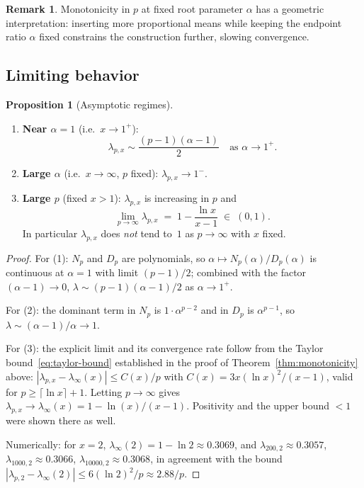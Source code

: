 \documentclass[11pt,a4paper]{article}
\theoremstyle{definition}
\newtheorem{proposition}{Proposition}[section]
\newtheorem{remark}{Remark}[section]
\begin{document}
\begin{remark}
Monotonicity in $p$ at fixed root parameter $\alpha$ has a geometric interpretation: inserting more proportional means while keeping the endpoint ratio $\alpha$ fixed constrains the construction further, slowing convergence.
\end{remark}

\subsection{Limiting behavior}

\begin{proposition}[Asymptotic regimes]
\label{prop:limits}
\mbox{}
\begin{enumerate}
  \item \textbf{Near $\alpha = 1$} (i.e.\ $x \to 1^+$):
  \[
    \lambda_{p,x} \sim \frac{(p-1)(\alpha - 1)}{2} \quad \text{as } \alpha \to 1^+.
  \]
  \item \textbf{Large $\alpha$} (i.e.\ $x \to \infty$, $p$ fixed): $\lambda_{p,x} \to 1^-$.
  \item \textbf{Large $p$} (fixed $x > 1$): $\lambda_{p,x}$ is increasing in $p$ and
  \[
    \lim_{p \to \infty} \lambda_{p,x} \;=\; 1 - \frac{\ln x}{x - 1}
     \;\in\; (0, 1).
  \]
  In particular $\lambda_{p,x}$ does \emph{not} tend to~$1$ as $p \to \infty$ with $x$ fixed.
\end{enumerate}
\end{proposition}

\begin{proof}
For (1): $N_p$ and $D_p$ are polynomials, so $\alpha \mapsto N_p(\alpha)/D_p(\alpha)$ is continuous at $\alpha = 1$ with limit $(p-1)/2$; combined with the factor $(\alpha - 1) \to 0$, $\lambda \sim (p-1)(\alpha-1)/2$ as $\alpha \to 1^+$.

For (2): the dominant term in $N_p$ is $1 \cdot \alpha^{p-2}$ and in $D_p$ is $\alpha^{p-1}$, so $\lambda \sim (\alpha-1)/\alpha \to 1$.

For (3): the explicit limit and its convergence rate follow from the Taylor bound~\eqref{eq:taylor-bound} established in the proof of Theorem~\ref{thm:monotonicity} above:
$|\lambda_{p,x} - \lambda_\infty(x)| \leq C(x)/p$ with $C(x) = 3x(\ln x)^2/(x-1)$, valid for $p \geq \lceil \ln x \rceil + 1$. Letting $p \to \infty$ gives $\lambda_{p,x} \to \lambda_\infty(x) = 1 - \ln(x)/(x-1)$. Positivity and the upper bound $< 1$ were shown there as well.

Numerically: for $x = 2$, $\lambda_\infty(2) = 1 - \ln 2 \approx 0.3069$, and $\lambda_{200,2} \approx 0.3057$, $\lambda_{1000,2} \approx 0.3066$, $\lambda_{10000,2} \approx 0.3068$, in agreement with the bound $|\lambda_{p,2} - \lambda_\infty(2)| \leq 6(\ln 2)^2/p \approx 2.88/p$.
\end{proof}
\end{document}
